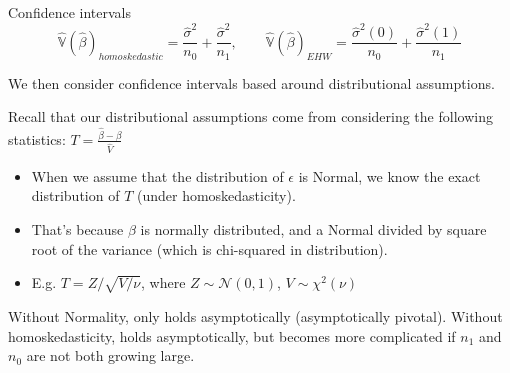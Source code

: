 \documentclass[notes,11pt, aspectratio=169]{beamer}
\newenvironment{wideitemize}{\itemize\addtolength{\itemsep}{10pt}}{\enditemize}
\begin{document}
\begin{frame}{Confidence intervals}
  \begin{equation*}
    \hat{\mathbb{V}}(\hat{\beta})_{homoskedastic} = \frac{\hat{\sigma}^{2}}{n_{0}} + \frac{\hat{\sigma}^{2}}{n_{1}}, \qquad \hat{\mathbb{V}}(\hat{\beta})_{EHW} = \frac{\hat{\sigma}^{2}(0)}{n_{0}} + \frac{\hat{\sigma}^{2}(1)}{n_{1}}
  \end{equation*}
  \begin{wideitemize}
  \item We then consider confidence intervals based around distributional assumptions.
    \item Recall that our distributional assumptions come from considering the following statistics: $T = \frac{\hat{\beta} - \beta}{\hat{V}}$    
    \begin{itemize}
    \item When we assume that the distribution of $\epsilon$ is
      Normal, we know the exact distribution of $T$ (under
      homoskedasticity).
    \item That's because $\beta$ is normally
      distributed, and a Normal divided by square root of the
      variance (which is chi-squared in distribution).
    \item E.g. $T = Z / \sqrt{V/\nu}$, where $Z \sim \mathcal{N}(0,1)$, $V \sim \chi^{2}(\nu)$
    \end{itemize}
  \item Without Normality, only holds asymptotically (asymptotically
      pivotal). Without homoskedasticity, holds asymptotically, but
      becomes more complicated if $n_{1}$ and $n_{0}$ are not both
      growing large.
  \end{wideitemize}
\end{frame}
\end{document}
